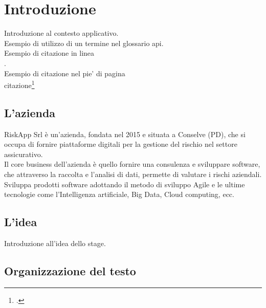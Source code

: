 \chapter{Introduzione}
\label{cap:introduzione}

Introduzione al contesto applicativo.\\

\noindent Esempio di utilizzo di un termine nel glossario \gls{api}. \\

\noindent Esempio di citazione in linea \\
\cite{site:agile-manifesto}. \\

\noindent Esempio di citazione nel pie' di pagina \\
citazione\footcite{womak:lean-thinking} \\

\section{L'azienda}

RiskApp Srl è un'azienda, fondata nel 2015 e situata a Conselve (PD), che si occupa di fornire piattaforme digitali per la gestione del rischio nel settore assicurativo.\\

Il core business dell'azienda è quello fornire una consulenza e sviluppare software, che attraverso la raccolta e l'analisi di dati, permette di valutare i rischi aziendali. \\

Sviluppa prodotti software adottando il metodo di sviluppo Agile e le ultime tecnologie come l'Intelligenza artificiale, Big Data, Cloud computing, ecc.\\

\section{L'idea}

Introduzione all'idea dello stage.

\section{Organizzazione del testo}

